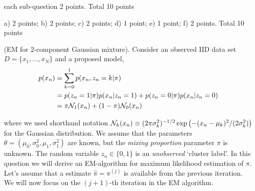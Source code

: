 \documentclass[a4paper]{article}
\begin{document}
\begin{exam}
\begin{vraag}{each sub-question 2 points. Total 10 points}
%
%
%

\end{vraag}

\begin{vraag}{a) 2 points; b) 2 points; c) 2 points; d) 1 point; e) 1 point; f) 2 points. Total 10 points}


(EM for 2-component Gaussian mixture). Consider an observed IID data set $D=\{x_1,\ldots,x_N\}$ and a proposed model,
\begin{align*}
p(x_n) &= \sum_{k=0}^1 p(x_n,z_n=k|\pi)\\
    &=  p(z_n=1|\pi)p(x_n|z_n=1) + p(z_n=0|\pi)p(x_n|z_n=0)\\
    &= \pi\mathcal{N}_1(x_n) +(1-\pi)\mathcal{N}_0(x_n)
\end{align*}


where we used shorthand notation $\mathcal{N}_k(x_n)\equiv (2\pi\sigma_k^2)^{-1/2}\exp\left(-(x_n-\mu_k)^2/(2\sigma_k^2)\right)$ for the Gaussian distribution. We assume that the parameters $\theta=(\mu_0,\sigma_0^2,\mu_1,\sigma_1^2)$ are known, but the \emph{mixing proportion} parameter $\pi$ is unknown.  The random variable $z_n \in \{0,1\}$ is an \emph{unobserved} `cluster label'.  In this question we will derive an EM-algorithm for maximum likelihood estimation of $\pi$. Let's assume that a estimate $\hat \pi = \pi^{(j)}$ is available from the previous iteration. We will now focus on the $(j+1)$-th iteration in the EM algorithm.


\end{vraag}
\end{exam}
\end{document}
